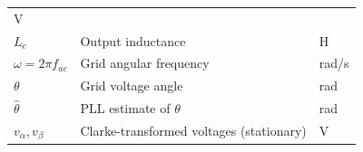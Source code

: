 \documentclass[11pt]{article}
\begin{document}
\begin{longtable}[]{@{}lll@{}}
\begin{minipage}[t]{0.27\columnwidth}
V\strut
\end{minipage}\tabularnewline
\begin{minipage}[t]{0.30\columnwidth}\raggedright
\(L_c\)\strut
\end{minipage} & \begin{minipage}[t]{0.34\columnwidth}\raggedright
Output inductance\strut
\end{minipage} & \begin{minipage}[t]{0.27\columnwidth}\raggedright
H\strut
\end{minipage}\tabularnewline
\begin{minipage}[t]{0.30\columnwidth}\raggedright
\(\omega = 2\pi f_{ac}\)\strut
\end{minipage} & \begin{minipage}[t]{0.34\columnwidth}\raggedright
Grid angular frequency\strut
\end{minipage} & \begin{minipage}[t]{0.27\columnwidth}\raggedright
rad/s\strut
\end{minipage}\tabularnewline
\begin{minipage}[t]{0.30\columnwidth}\raggedright
\(\theta\)\strut
\end{minipage} & \begin{minipage}[t]{0.34\columnwidth}\raggedright
Grid voltage angle\strut
\end{minipage} & \begin{minipage}[t]{0.27\columnwidth}\raggedright
rad\strut
\end{minipage}\tabularnewline
\begin{minipage}[t]{0.30\columnwidth}\raggedright
\(\hat{\theta}\)\strut
\end{minipage} & \begin{minipage}[t]{0.34\columnwidth}\raggedright
PLL estimate of \(\theta\)\strut
\end{minipage} & \begin{minipage}[t]{0.27\columnwidth}\raggedright
rad\strut
\end{minipage}\tabularnewline
\begin{minipage}[t]{0.30\columnwidth}\raggedright
\(v_\alpha, v_\beta\)\strut
\end{minipage} & \begin{minipage}[t]{0.34\columnwidth}\raggedright
Clarke-transformed voltages (stationary)\strut
\end{minipage} & \begin{minipage}[t]{0.27\columnwidth}\raggedright
V\strut
\end{minipage}\tabularnewline

\end{longtable}
\end{document}
